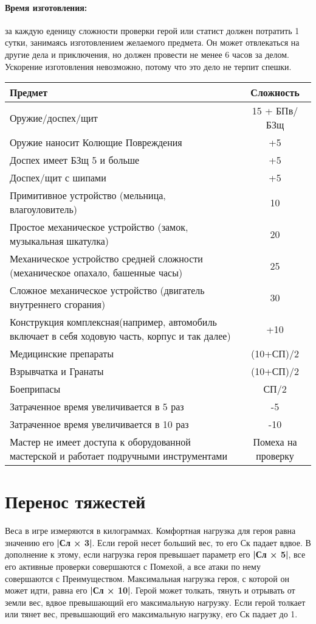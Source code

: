 \paragraph{Время изготовления:} за каждую еденицу сложности проверки герой или статист должен потратить 1 сутки, занимаясь изготовлением желаемого предмета. Он может отвлекаться на другие дела и приключения, но должен провести не менее 6 часов за делом. Ускорение изготовления невозможно, потому что это дело не терпит спешки.
\begin{center}
\begin{tabular}{|p{10cm}|c|}
\hline
Предмет & Сложность \\ \hline
Оружие/доспех/щит & 15 + БПв/БЗщ \\ \hline
Оружие наносит Колющие Повреждения & +5 \\ \hline
Доспех имеет БЗщ 5 и больше & +5 \\ \hline
Доспех/щит с шипами & +5 \\ \hline
Примитивное устройство (мельница, влагоуловитель) & 10 \\ \hline
Простое механическое устройство (замок, музыкальная шкатулка) & 20 \\ \hline
Механическое устройство средней сложности (механическое опахало, башенные часы) & 25 \\ \hline
Сложное механическое устройство (двигатель внутреннего сгорания) & 30 \\ \hline
Конструкция комплексная(например, автомобиль включает в себя ходовую часть, корпус и так далее) & +10 \\ \hline
Медицинские препараты & (10+СП)/2 \\ \hline
Взрывчатка и Гранаты & (10+СП)/2 \\ \hline
Боеприпасы & СП/2 \\ \hline
Затраченное время увеличивается в 5 раз & -5 \\ \hline
Затраченное время увеличивается в 10 раз & -10 \\ \hline
Мастер не имеет доступа к оборудованной мастерской и работает подручными инструментами & Помеха на проверку \\ \hline
\end{tabular}
\end{center}




\section{Перенос тяжестей}
Веса в игре измеряются в килограммах. Комфортная нагрузка для героя равна значению его \textbf{|Сл × 3|}. Если герой несет больший вес, то его Ск падает вдвое. В дополнение к этому, если нагрузка героя превышает параметр его \textbf{|Сл × 5|}, все его активные проверки совершаются с Помехой, а все атаки по нему совершаются с Преимуществом. Максимальная нагрузка героя, с которой он может идти, равна его \textbf{|Сл × 10|}.
\newline
Герой может толкать, тянуть и отрывать от земли вес, вдвое превышающий его максимальную нагрузку. Если герой толкает или тянет вес, превышающий его максимальную нагрузку, его Ск падает до 1.
